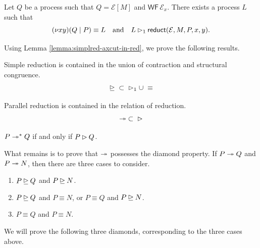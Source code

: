 \begin{lemma} \label{lemma:simplred-axcut-in-red}
  Let $Q$ be a process such that $Q = \mathcal{E}[M]$ and $\mathsf{WF} \, \mathcal{E}_x$.
  There exists a process $L$ such that
  \[
    (\nu x y)(Q \mid P) \equiv L \quad \text{and} \quad
    L \rhd_1 \mathsf{reduct}(\mathcal{E}, M, P, x, y).
  \]
\end{lemma}

Using Lemma \ref{lemma:simplred-axcut-in-red}, we prove the following results.

\begin{lemma} \label{lemma:simplred-in-contr-cup-equiv}
  Simple reduction is contained in the union of contraction and structural congruence.
  \[
    \unrhd \; \subset \; \rhd_1 \; \cup \; \equiv
  \]
\end{lemma}

\begin{corollary} \label{cor:parred-in-red}
  Parallel reduction is contained in the relation of reduction.
  \[
    \twoheadrightarrow \; \subset \; \rhd
  \]
\end{corollary}

\begin{lemma} \label{lemma:parred-red-coincides}
  $P \twoheadrightarrow^* Q$ if and only if $P \rhd Q$.
\end{lemma}

What remains is to prove that $\twoheadrightarrow$ possesses the diamond property.
If $P \twoheadrightarrow Q$ and $P \twoheadrightarrow N$, then there are three cases to consider.

\begin{enumerate}
  \item $P \unrhd Q$ and $P \unrhd N$.
  \item $P \unrhd Q$ and $P \equiv N$, or $P \equiv Q$ and $P \unrhd N$.
  \item $P \equiv Q$ and $P \equiv N$.
\end{enumerate}

We will prove the following three diamonds, corresponding to the three cases above.

